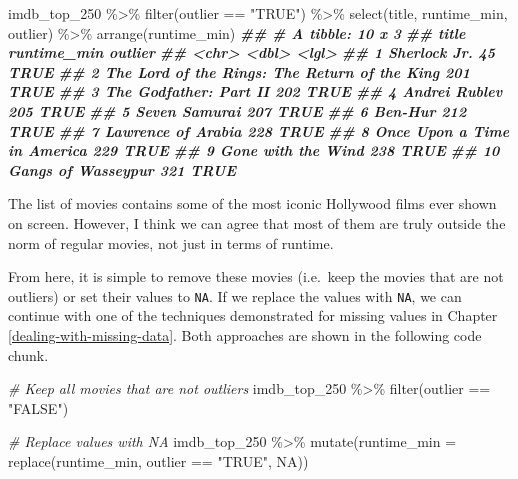 \documentclass[
]{book}
\newenvironment{Shaded}{\begin{snugshade}}{\end{snugshade}}
\newcommand{\AttributeTok}[1]{\textcolor[rgb]{0.77,0.63,0.00}{#1}}
\newcommand{\CommentTok}[1]{\textcolor[rgb]{0.56,0.35,0.01}{\textit{#1}}}
\newcommand{\ConstantTok}[1]{\textcolor[rgb]{0.00,0.00,0.00}{#1}}
\newcommand{\DocumentationTok}[1]{\textcolor[rgb]{0.56,0.35,0.01}{\textbf{\textit{#1}}}}
\newcommand{\FunctionTok}[1]{\textcolor[rgb]{0.00,0.00,0.00}{#1}}
\newcommand{\NormalTok}[1]{#1}
\newcommand{\SpecialCharTok}[1]{\textcolor[rgb]{0.00,0.00,0.00}{#1}}
\newcommand{\StringTok}[1]{\textcolor[rgb]{0.31,0.60,0.02}{#1}}
\begin{document}
\begin{Shaded}
\begin{Highlighting}[]
\NormalTok{imdb\_top\_250 }\SpecialCharTok{\%\textgreater{}\%} 
  \FunctionTok{filter}\NormalTok{(outlier }\SpecialCharTok{==} \StringTok{"TRUE"}\NormalTok{) }\SpecialCharTok{\%\textgreater{}\%} 
  \FunctionTok{select}\NormalTok{(title, runtime\_min, outlier) }\SpecialCharTok{\%\textgreater{}\%} 
  \FunctionTok{arrange}\NormalTok{(runtime\_min)}
\DocumentationTok{\#\# \# A tibble: 10 x 3}
\DocumentationTok{\#\#    title                                         runtime\_min outlier}
\DocumentationTok{\#\#    \textless{}chr\textgreater{}                                               \textless{}dbl\textgreater{} \textless{}lgl\textgreater{}  }
\DocumentationTok{\#\#  1 Sherlock Jr.                                           45 TRUE   }
\DocumentationTok{\#\#  2 The Lord of the Rings: The Return of the King         201 TRUE   }
\DocumentationTok{\#\#  3 The Godfather: Part II                                202 TRUE   }
\DocumentationTok{\#\#  4 Andrei Rublev                                         205 TRUE   }
\DocumentationTok{\#\#  5 Seven Samurai                                         207 TRUE   }
\DocumentationTok{\#\#  6 Ben{-}Hur                                               212 TRUE   }
\DocumentationTok{\#\#  7 Lawrence of Arabia                                    228 TRUE   }
\DocumentationTok{\#\#  8 Once Upon a Time in America                           229 TRUE   }
\DocumentationTok{\#\#  9 Gone with the Wind                                    238 TRUE   }
\DocumentationTok{\#\# 10 Gangs of Wasseypur                                    321 TRUE}
\end{Highlighting}
\end{Shaded}

The list of movies contains some of the most iconic Hollywood films ever shown on screen. However, I think we can agree that most of them are truly outside the norm of regular movies, not just in terms of runtime.

From here, it is simple to remove these movies (i.e.~keep the movies that are not outliers) or set their values to \texttt{NA}. If we replace the values with \texttt{NA}, we can continue with one of the techniques demonstrated for missing values in Chapter \ref{dealing-with-missing-data}. Both approaches are shown in the following code chunk.

\begin{Shaded}
\begin{Highlighting}[]
\CommentTok{\# Keep all movies that are not outliers}
\NormalTok{imdb\_top\_250 }\SpecialCharTok{\%\textgreater{}\%} 
  \FunctionTok{filter}\NormalTok{(outlier }\SpecialCharTok{==} \StringTok{"FALSE"}\NormalTok{)}

\CommentTok{\# Replace values with NA}
\NormalTok{imdb\_top\_250 }\SpecialCharTok{\%\textgreater{}\%} 
  \FunctionTok{mutate}\NormalTok{(}\AttributeTok{runtime\_min =} \FunctionTok{replace}\NormalTok{(runtime\_min, outlier }\SpecialCharTok{==} \StringTok{"TRUE"}\NormalTok{, }\ConstantTok{NA}\NormalTok{))}
\end{Highlighting}
\end{Shaded}
\end{document}
